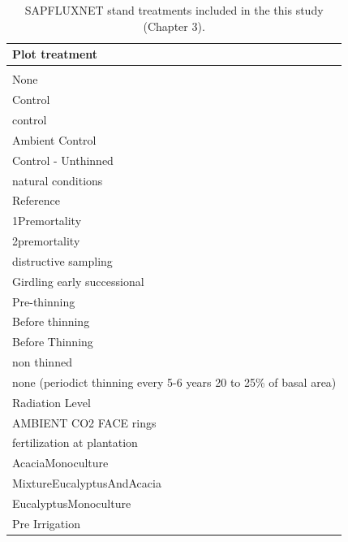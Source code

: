 \documentclass[11pt,twoside]{reedthesis}
\begin{document}
\begin{table}[H]

\caption[SAPFLUXNET stand treatments included in the this study.]{\label{tab:unnamed-chunk-13}SAPFLUXNET stand treatments included in the this study (Chapter 3).}
\centering
\fontsize{12}{14}\selectfont
\begin{tabular}[t]{l}
\toprule
Plot treatment\\
\midrule
\\
None\\
Control\\
control\\
Ambient Control\\
Control - Unthinned\\
natural conditions\\
Reference\\
1Premortality\\
2premortality\\
distructive sampling\\
Girdling early successional\\
Pre-thinning\\
Before thinning\\
Before Thinning\\
non thinned\\
none (periodict thinning every 5-6 years  20 to 25\% of basal area)\\
Radiation Level\\
AMBIENT CO2 FACE rings\\
fertilization at plantation\\
AcaciaMonoculture\\
MixtureEucalyptusAndAcacia\\
EucalyptusMonoculture\\
Pre Irrigation\\
\bottomrule
\end{tabular}
\end{table}\newpage
\end{document}
